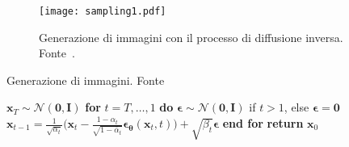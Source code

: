 \begin{figure}
\centering
\texttt{[image: sampling1.pdf]}
\caption{Generazione di immagini con il processo di diffusione inversa. Fonte~\cite{royBeginnerGuideDiffusion}.}
\label{fig:sampling}
\end{figure}


\begin{algorithm}
    \caption{Generazione di immagini. Fonte~\cite{ho2020}}\label{alg:sampling}
   \begin{algorithmic}[1]
    \State $\mathbf{x}_T\sim\mathcal{N}(\bm{0},\bm{I})$
    \State \textbf{for} $t=T,\dots,1$ \textbf{do}
      \State \hspace{2em}$\mathbf{\bm{\epsilon}}\sim\mathcal{N}(\bm{0},\bm{I})$ if $t>1$, else $\mathbf{\bm{\epsilon}}=\bm{0}$
      \State \hspace{2em}$\mathbf{x}_{t-1}=\frac{1}{\sqrt{\alpha_t}}\biggl(\mathbf{x}_t-\frac{1-\alpha_t}{\sqrt{1-\overline{\alpha}_t}}\bm{\epsilon}_{\bm{\theta}}(\mathbf{x}_t,t)\biggr)+\sqrt{\beta_t}\mathbf{\bm{\epsilon}}$
    \State \textbf{end for}
    \State \textbf{return} $\mathbf{x}_0$
   \end{algorithmic}
\end{algorithm}